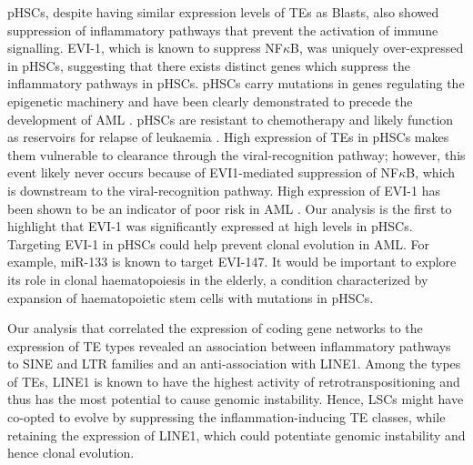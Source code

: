 pHSCs, despite having similar expression levels of TEs as Blasts, also showed suppression of inflammatory pathways that prevent the activation of immune signalling. EVI-1, which is known to suppress NF$\kappa$B, was uniquely over-expressed in pHSCs, suggesting that there exists distinct genes which suppress the inflammatory pathways in pHSCs. pHSCs carry mutations in genes regulating the epigenetic machinery and have been clearly demonstrated to precede the development of AML \cite{Jan2012}. pHSCs are resistant to chemotherapy and likely function as reservoirs for relapse of leukaemia \cite{Corces-Zimmerman2014a, Corces-Zimmerman2014b}. High expression of TEs in pHSCs makes them vulnerable to clearance through the viral-recognition pathway; however, this event likely never occurs because of EVI1-mediated suppression of NF$\kappa$B, which is downstream to the viral-recognition pathway. High expression of EVI-1 has been shown to be an indicator of poor risk in AML \cite{Haas2008}. Our analysis is the first to highlight that EVI-1 was significantly expressed at high levels in pHSCs. Targeting EVI-1 in pHSCs could help prevent clonal evolution in AML. For example, miR-133 is known to target EVI-147. It would be important to explore its role in clonal haematopoiesis in the elderly, a condition characterized by expansion of haematopoietic stem cells with mutations in pHSCs.

Our analysis that correlated the expression of coding gene networks to the expression of TE types revealed an association between inflammatory pathways to SINE and LTR families and an anti-association with LINE1. Among the types of TEs, LINE1 is known to have the highest activity of retrotranspositioning and thus has the most potential to cause genomic instability. Hence, LSCs might have co-opted to evolve by suppressing the inflammation-inducing TE classes, while retaining the expression of LINE1, which could potentiate genomic instability and hence clonal evolution.


